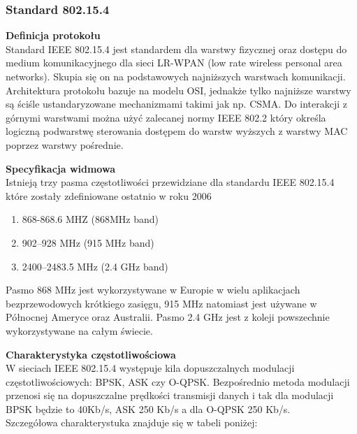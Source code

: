 \subsubsection{Standard 802.15.4}

\par
\tab \textbf{Definicja protokołu} \\
Standard IEEE 802.15.4 jest standardem dla warstwy fizycznej oraz dostępu do medium komunikacyjnego dla sieci LR-WPAN (low rate wireless personal area networks). Skupia się on na podstawowych najniższych warstwach komunikacji. Architektura protokołu bazuje na modelu OSI, jednakże tylko najniższe warstwy są ściśle ustandaryzowane mechanizmami takimi jak np. CSMA. Do interakcji z górnymi warstwami można użyć zalecanej normy IEEE 802.2 który określa logiczną podwarstwę sterowania dostępem do warstw wyższych z warstwy MAC poprzez warstwy pośrednie.

\par
\tab \textbf{Specyfikacja widmowa} \\
Istnieją trzy pasma częstotliwości przewidziane dla standardu IEEE 802.15.4 które zostały zdefiniowane ostatnio w roku 2006
\begin{enumerate}
	\item 868-868.6 MHZ (868MHz band)
	\item 902–928  MHz (915 MHz band)
	\item 2400–2483.5 MHz (2.4 GHz band)
\end{enumerate} 

Pasmo 868 MHz jest wykorzystywane w Europie w wielu aplikacjach bezprzewodowych krótkiego zasięgu, 915 MHz natomiast jest używane w Północnej Ameryce oraz Australii. Pasmo 2.4 GHz jest z koleji powszechnie wykorzystywane na całym świecie. \\

\par
\tab \textbf{Charakterystyka częstotliwościowa} \\
W sieciach IEEE 802.15.4 występuje kila dopuszczalnych modulacji częstotliwościowych: BPSK, ASK czy O-QPSK. Bezpośrednio metoda modulacji przenosi się na dopuszczalne prędkości transmisji danych i tak dla modulacji BPSK będzie to 40Kb/s, ASK 250 Kb/s a dla O-QPSK 250 Kb/s. \\
Szczegółowa charakterystuka znajduje się w tabeli poniżej: \\

